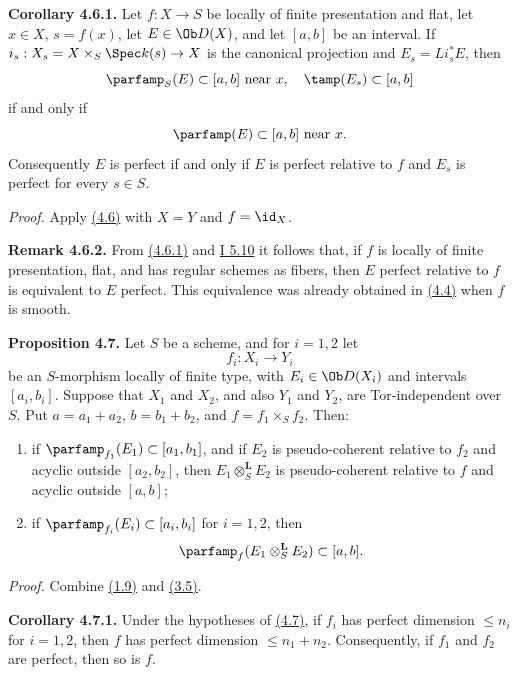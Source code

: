 \textbf{Corollary 4.6.1.} Let \(f:X\to S\) be locally of finite presentation and flat, let \(x\in X\), \(s=f(x)\), let \(E\in\Ob D(X)\), and let \([a,b]\) be an interval. If \(i_s:X_s=X\times_S\Spec k(s)\to X\) is the canonical projection and \(E_s=Li_s^*E\), then
\[
 \parfamp_S(E)
  \subset[a,b]\text{ near }x,
 \quad
 \tamp(E_s)
  \subset[a,b]
\]
if and only if
\[
 \parfamp(E)
  \subset[a,b]\text{ near }x.
\]
Consequently \(E\) is perfect if and only if \(E\) is perfect relative to \(f\) and \(E_s\) is perfect for every \(s\in S\).

\emph{Proof.} Apply \hyperlink{sga6.e03.prop.4-6}{(4.6)} with \(X=Y\) and \(f=\id_X\).

\textbf{Remark 4.6.2.} From \hyperlink{sga6.e03.cor.4-6-1}{(4.6.1)} and \hyperlink{sga6.e01.cor.5-10}{I 5.10} it follows that, if \(f\) is locally of finite presentation, flat, and has regular schemes as fibers, then \(E\) perfect relative to \(f\) is equivalent to \(E\) perfect. This equivalence was already obtained in \hyperlink{sga6.e03.prop.4-4}{(4.4)} when \(f\) is smooth.

\textbf{Proposition 4.7.} Let \(S\) be a scheme, and for \(i=1,2\) let
\[
 f_i:X_i\longrightarrow Y_i
\]
be an \(S\)-morphism locally of finite type, with \(E_i\in\Ob D(X_i)\) and intervals \([a_i,b_i]\). Suppose that \(X_1\) and \(X_2\), and also \(Y_1\) and \(Y_2\), are Tor-independent over \(S\). Put \(a=a_1+a_2\), \(b=b_1+b_2\), and \(f=f_1\times_S f_2\). Then:
\begin{enumerate}[label=\alph*)]
\item if \(\parfamp_{f_1}(E_1)\subset[a_1,b_1]\), and if \(E_2\) is pseudo-coherent relative to \(f_2\) and acyclic outside \([a_2,b_2]\), then \(E_1\otimes_S^{\mathbf L}E_2\) is pseudo-coherent relative to \(f\) and acyclic outside \([a,b]\);
\item if \(\parfamp_{f_i}(E_i)\subset[a_i,b_i]\) for \(i=1,2\), then
\[
 \parfamp_f(E_1\otimes_S^{\mathbf L}E_2)
 \subset[a,b].
\]
\end{enumerate}

\emph{Proof.} Combine \hyperlink{sga6.e03.cor.1-9}{(1.9)} and \hyperlink{sga6.e03.prop.3-5}{(3.5)}.

\textbf{Corollary 4.7.1.} Under the hypotheses of \hyperlink{sga6.e03.prop.4-7}{(4.7)}, if \(f_i\) has perfect dimension \(\leq n_i\) for \(i=1,2\), then \(f\) has perfect dimension \(\leq n_1+n_2\). Consequently, if \(f_1\) and \(f_2\) are perfect, then so is \(f\).

